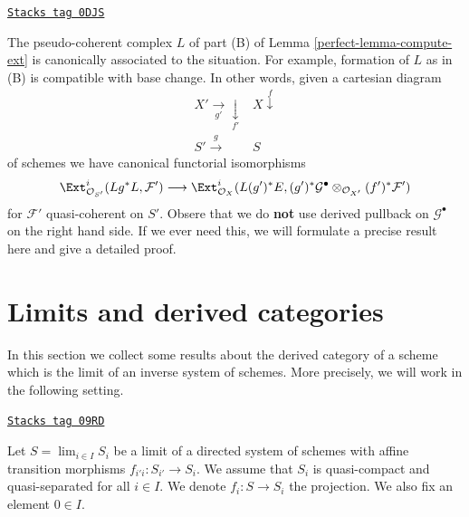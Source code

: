 \begin{remark}
\label{perfect-remark-base-change-of-L}
\href{https://stacks.math.columbia.edu/tag/0DJS}{\texttt{Stacks tag 0DJS}}

The pseudo-coherent complex $L$ of part (B) of Lemma \ref{perfect-lemma-compute-ext}
is canonically associated to the situation. For example,
formation of $L$ as in (B) is compatible with base change.
In other words, given a cartesian diagram
$$
\begin{array}{cc}X' \underset{g'}{\longrightarrow}\underset{f'}{\downarrow} & X \overset{f}{\downarrow} \\ S' \overset{g}{\longrightarrow} & S\end{array}
$$
of schemes we have canonical functorial isomorphisms
$$
\Ext^i_{\mathcal{O}_{S'}}(Lg^*L, \mathcal{F}') \longrightarrow
\Ext^i_{\mathcal{O}_X}(L(g')^*E,
(g')^*\mathcal{G}^\bullet \otimes_{\mathcal{O}_{X'}} (f')^*\mathcal{F}')
$$
for $\mathcal{F}'$ quasi-coherent on $S'$. Obsere that we do {\bf not} use
derived pullback on $\mathcal{G}^\bullet$ on the right hand side.
If we ever need this, we will
formulate a precise result here and give a detailed proof.
\end{remark}

\section{Limits and derived categories}
\label{perfect-section-limits}
In this section we collect some results about the derived category
of a scheme which is the limit of an inverse system of schemes.
More precisely, we will work in the following setting.

\begin{definition}
\label{perfect-situation-descent}
\href{https://stacks.math.columbia.edu/tag/09RD}{\texttt{Stacks tag 09RD}}

Let $S = \lim_{i \in I} S_i$ be a limit of a directed system of schemes
with affine transition morphisms $f_{i'i} : S_{i'} \to S_i$.
We assume that $S_i$ is quasi-compact and quasi-separated for all $i \in I$.
We denote $f_i : S \to S_i$ the projection. We also fix an element $0 \in I$.
\end{definition}

